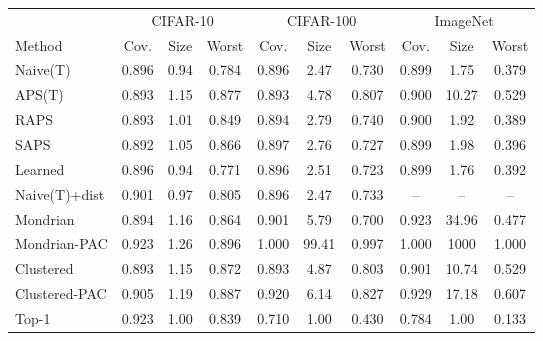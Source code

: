\begin{tabular}{lccccccccc}
\toprule
 & \multicolumn{3}{c}{CIFAR-10} & \multicolumn{3}{c}{CIFAR-100} & \multicolumn{3}{c}{ImageNet} \\
\cmidrule(lr){2-4} \cmidrule(lr){5-7} \cmidrule(lr){8-10}
Method & Cov. & Size & Worst & Cov. & Size & Worst & Cov. & Size & Worst \\
\midrule
Naive(T) & 0.896 & 0.94 & 0.784 & 0.896 & 2.47 & 0.730 & 0.899 & 1.75 & 0.379 \\
APS(T) & 0.893 & 1.15 & 0.877 & 0.893 & 4.78 & 0.807 & 0.900 & 10.27 & 0.529 \\
RAPS & 0.893 & 1.01 & 0.849 & 0.894 & 2.79 & 0.740 & 0.900 & 1.92 & 0.389 \\
SAPS & 0.892 & 1.05 & 0.866 & 0.897 & 2.76 & 0.727 & 0.899 & 1.98 & 0.396 \\
Learned & 0.896 & 0.94 & 0.771 & 0.896 & 2.51 & 0.723 & 0.899 & 1.76 & 0.392 \\
\addlinespace[2pt]
Naive(T)+dist & 0.901 & 0.97 & 0.805 & 0.896 & 2.47 & 0.733 & -- & -- & -- \\
Mondrian & 0.894 & 1.16 & 0.864 & 0.901 & 5.79 & 0.700 & 0.923 & 34.96 & 0.477 \\
Mondrian-PAC & 0.923 & 1.26 & 0.896 & 1.000 & 99.41 & 0.997 & 1.000 & 1000 & 1.000 \\
Clustered & 0.893 & 1.15 & 0.872 & 0.893 & 4.87 & 0.803 & 0.901 & 10.74 & 0.529 \\
Clustered-PAC & 0.905 & 1.19 & 0.887 & 0.920 & 6.14 & 0.827 & 0.929 & 17.18 & 0.607 \\
Top-1 & 0.923 & 1.00 & 0.839 & 0.710 & 1.00 & 0.430 & 0.784 & 1.00 & 0.133 \\
\bottomrule
\end{tabular}
